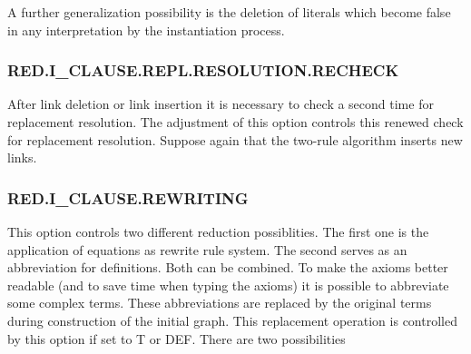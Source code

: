 A further generalization possibility is the deletion of literals which 
become false in any interpretation by the instantiation process. 

\PO 
{}






\subsubsection{RED.I\_CLAUSE.REPL.RESOLUTION.RECHECK}

After link deletion or link insertion it is necessary to check a second time 
for replacement resolution. The adjustment of this 
option controls this renewed check for replacement resolution. 
Suppose again that the two-rule algorithm inserts new links.

                                                        
\PO
{}

\subsubsection{RED.I\_CLAUSE.REWRITING}

This option controls two different reduction possiblities.
The first one is the application of equations as rewrite rule system.
The second serves as an abbreviation for definitions.
Both can be combined.
To make the axioms better readable (and to save time when typing the 
axioms) it is possible to abbreviate some complex terms. These 
abbreviations are replaced by the original terms during construction of the 
initial graph. This replacement operation is controlled by this option
if set to T or DEF. There are two possibilities

